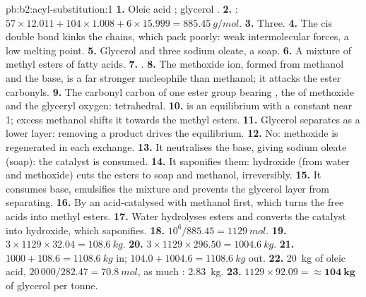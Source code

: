 \begin{solution}{pb:b2:acyl-substitution:1}
\textbf{1.} Oleic acid ; glycerol .
\textbf{2.} : $57 \times 12.011 + 104 \times 1.008 + 6 \times 15.999 = \qty{885.45}{g/mol}$.
\textbf{3.} Three.
\textbf{4.} The cis double bond kinks the chains, which pack poorly: weak intermolecular forces, a
low melting point.
\textbf{5.} Glycerol and three sodium oleate, a soap.
\textbf{6.} A mixture of methyl esters of fatty acids.
\textbf{7.} .
\textbf{8.} The methoxide ion, formed from methanol and the base, is a far stronger nucleophile than
methanol; it attacks the ester carbonyls.
\textbf{9.} The carbonyl carbon of one ester group bearing , the  of methoxide and the
glyceryl oxygen: tetrahedral.
\textbf{10.}  is an equilibrium with a constant near 1; excess methanol shifts it
towards the methyl esters.
\textbf{11.} Glycerol separates as a lower layer: removing a product drives the equilibrium.
\textbf{12.} No: methoxide is regenerated in each exchange.
\textbf{13.} It neutralises the base, giving sodium oleate (soap): the catalyst is consumed.
\textbf{14.} It saponifies them: hydroxide (from water and methoxide) cuts the esters to soap and
methanol, irreversibly.
\textbf{15.} It consumes base, emulsifies the mixture and prevents the glycerol layer from separating.
\textbf{16.} By an acid-catalysed  with methanol first, which turns the free acids into
methyl esters.
\textbf{17.} Water hydrolyses esters and converts the catalyst into hydroxide, which saponifies.
\textbf{18.} $10^6/885.45 = \qty{1129}{mol}$.
\textbf{19.} $3 \times 1129 \times 32.04 = \qty{108.6}{kg}$.
\textbf{20.} $3 \times 1129 \times 296.50 = \qty{1004.6}{kg}$.
\textbf{21.} $1000 + 108.6 = \qty{1108.6}{kg}$ in; $104.0 + 1004.6 = \qty{1108.6}{kg}$ out.
\textbf{22.} \qty{20}{kg} of oleic acid, $20\,000/282.47 = \qty{70.8}{mol}$, as much :
\qty{2.83}{kg}.
\textbf{23.} $1129 \times 92.09 = \boldsymbol{\approx \qty{104}{kg}}$ of glycerol per tonne.
\end{solution}

